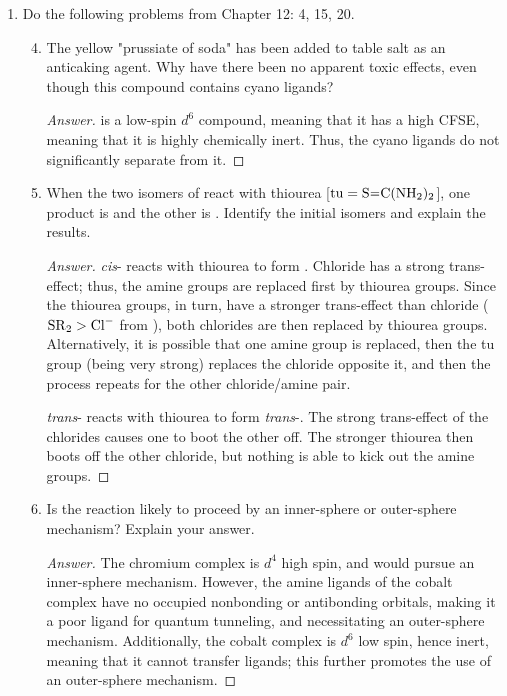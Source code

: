 \documentclass[../psets.tex]{subfiles}
\begin{document}
\begin{enumerate}[label={\Roman*)}]
\begin{enumerate}
\begin{proof}[Answer]
        \end{proof}
    \end{enumerate}
    \newpage
    \item Do the following problems from Chapter 12: 4, 15, 20.
    \begin{enumerate}[label={\textbf{12.\arabic*}}]
        \setcounter{enumii}{3}
        \item The yellow "prussiate of soda"  has been added to table salt as an anticaking agent. Why have there been no apparent toxic effects, even though this compound contains cyano ligands?
        \begin{proof}[Answer]
             is a low-spin $d^6$ compound, meaning that it has a high CFSE, meaning that it is highly chemically inert. Thus, the cyano ligands do not significantly separate from it.
        \end{proof}
        \newpage
        \setcounter{enumii}{14}
        \item When the two isomers of  react with thiourea [$\text{tu}=\ce{S=C(NH2)2}$], one product is  and the other is . Identify the initial isomers and explain the results.
        \begin{proof}[Answer]
            \emph{cis}- reacts with thiourea to form . Chloride has a strong trans-effect; thus, the amine groups are replaced first by thiourea groups. Since the thiourea groups, in turn, have a stronger trans-effect than chloride ($\ce{SR2}>\ce{Cl-}$ from \cite[460]{bib:MiesslerFischerTarr}), both chlorides are then replaced by thiourea groups. Alternatively, it is possible that one amine group is replaced, then the tu group (being very strong) replaces the chloride opposite it, and then the process repeats for the other chloride/amine pair.\par
            \emph{trans}- reacts with thiourea to form \emph{trans}-. The strong trans-effect of the chlorides causes one to boot the other off. The stronger thiourea then boots off the other chloride, but nothing is able to kick out the amine groups.
        \end{proof}
        \newpage
        \setcounter{enumii}{19}
        \item Is the reaction  likely to proceed by an inner-sphere or outer-sphere mechanism? Explain your answer.
        \begin{proof}[Answer]
            The chromium complex is $d^4$ high spin, and would pursue an inner-sphere mechanism. However, the amine ligands of the cobalt complex have no occupied nonbonding or antibonding orbitals, making it a poor ligand for quantum tunneling, and necessitating an outer-sphere mechanism. Additionally, the cobalt complex is $d^6$ low spin, hence inert, meaning that it cannot transfer ligands; this further promotes the use of an outer-sphere mechanism.
        \end{proof}
    \end{enumerate}
\end{enumerate}
\end{document}
